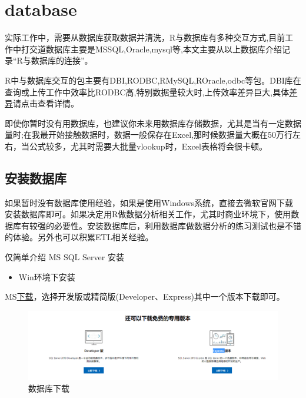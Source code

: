 \documentclass[
]{book}
\providecommand{\tightlist}{%
  \setlength{\itemsep}{0pt}\setlength{\parskip}{0pt}}
\begin{document}
\hypertarget{database}{%
\chapter{database}\label{database}}

实际工作中，需要从数据库获取数据并清洗，R与数据库有多种交互方式,目前工作中打交道数据库主要是MSSQL,Oracle,mysql等,本文主要从以上数据库介绍记录``R与数据库的连接''。

R中与数据库交互的包主要有DBI,RODBC,RMySQL,ROracle,odbc等包。DBI库在查询或上传工作中效率比RODBC高,特别数据量较大时,上传效率差异巨大,具体\href{https://github.com/r-dbi/odbc}{差异}请点击查看详情。

即使你暂时没有用数据库，也建议你未来用数据库存储数据，尤其是当有一定数据量时;在我最开始接触数据时，数据一般保存在Excel,那时候数据量大概在50万行左右，当公式较多，尤其时需要大批量vlookup时，Excel表格将会很卡顿。

\hypertarget{ux5b89ux88c5ux6570ux636eux5e93}{%
\section{安装数据库}\label{ux5b89ux88c5ux6570ux636eux5e93}}

如果暂时没有数据库使用经验，如果是使用Windows系统，直接去微软官网下载安装数据库即可。如果决定用R做数据分析相关工作，尤其时商业环境下，使用数据库有较强的必要性。安装数据库后，利用数据库做数据分析的练习测试也是不错的体验。另外也可以积累ETL相关经验。

仅简单介绍 MS SQL Server 安装

\begin{itemize}
\tightlist
\item
  Win环境下安装
\end{itemize}

MS\href{https://www.microsoft.com/zh-cn/sql-server/sql-server-downloads}{下载}，选择开发版或精简版(Developer、Express)其中一个版本下载即可。

\begin{figure}
\centering
\includegraphics{./picture/chap2/ms install.png}
\caption{数据库下载}
\end{figure}
\end{document}
